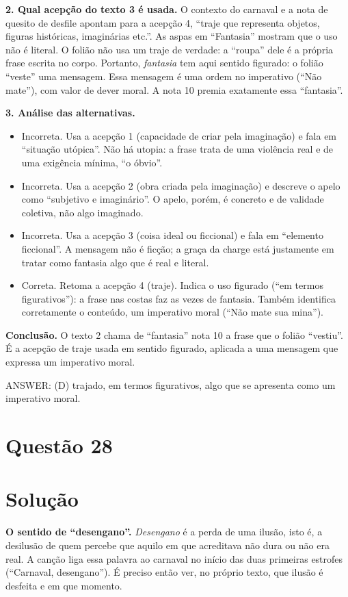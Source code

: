 \documentclass{article}%
\begin{document}
\textbf{2. Qual acepção do texto 3 é usada.} O contexto do carnaval e a nota de quesito de desfile apontam para a acepção 4, ``traje que representa objetos, figuras históricas, imaginárias etc.''. As aspas em ``Fantasia'' mostram que o uso não é literal. O folião não usa um traje de verdade: a ``roupa'' dele é a própria frase escrita no corpo. Portanto, \emph{fantasia} tem aqui sentido figurado: o folião ``veste'' uma mensagem. Essa mensagem é uma ordem no imperativo (``Não mate''), com valor de dever moral. A nota 10 premia exatamente essa ``fantasia''.

\textbf{3. Análise das alternativas.}
\begin{itemize}
\item[a)] Incorreta. Usa a acepção 1 (capacidade de criar pela imaginação) e fala em ``situação utópica''. Não há utopia: a frase trata de uma violência real e de uma exigência mínima, ``o óbvio''.
\item[b)] Incorreta. Usa a acepção 2 (obra criada pela imaginação) e descreve o apelo como ``subjetivo e imaginário''. O apelo, porém, é concreto e de validade coletiva, não algo imaginado.
\item[c)] Incorreta. Usa a acepção 3 (coisa ideal ou ficcional) e fala em ``elemento ficcional''. A mensagem não é ficção; a graça da charge está justamente em tratar como fantasia algo que é real e literal.
\item[d)] Correta. Retoma a acepção 4 (traje). Indica o uso figurado (``em termos figurativos''): a frase nas costas faz as vezes de fantasia. Também identifica corretamente o conteúdo, um imperativo moral (``Não mate sua mina'').
\end{itemize}

\textbf{Conclusão.} O texto 2 chama de ``fantasia'' nota 10 a frase que o folião ``vestiu''. É a acepção de traje usada em sentido figurado, aplicada a uma mensagem que expressa um imperativo moral.

ANSWER: (D) trajado, em termos figurativos, algo que se apresenta como um imperativo moral.%
\newpage%
\section*{Questão 28}

\section*{Solução}

\textbf{O sentido de ``desengano''.} \emph{Desengano} é a perda de uma ilusão, isto é, a desilusão de quem percebe que aquilo em que acreditava não dura ou não era real. A canção liga essa palavra ao carnaval no início das duas primeiras estrofes (``Carnaval, desengano''). É preciso então ver, no próprio texto, que ilusão é desfeita e em que momento.
\end{document}
